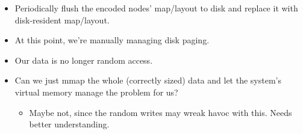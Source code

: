 \documentclass[11pt]{article}
\begin{document}
\begin{enumerate}
\begin{enumerate}
\begin{itemize}
\begin{itemize}
\item Periodically flush the encoded nodes' map/layout to disk and replace it with disk-resident map/layout.
\item At this point, we're manually managing disk paging.
\item Our data is no longer random access.
\item Can we just mmap the whole (correctly sized) data and let the system's virtual memory manage the problem for us?
\begin{itemize}
\item Maybe not, since the random writes may wreak havoc with this. Needs better understanding.
\end{itemize}
\end{itemize}
\end{itemize}
\end{enumerate}
\end{enumerate}
\end{document}
